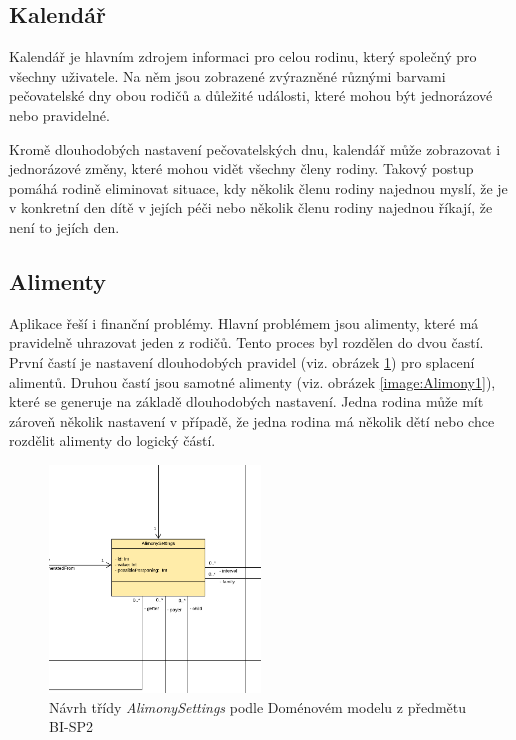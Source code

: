     \subsection{Kalendář}    
        Kalendář je hlavním zdrojem informaci pro celou rodinu, který společný pro všechny uživatele. Na něm jsou zobrazené zvýrazněné různými barvami pečovatelské dny obou rodičů a důležité události, které mohou být jednorázové nebo pravidelné. 
        
        Kromě dlouhodobých nastavení pečovatelských dnu, kalendář může zobrazovat i jednorázové změny, které mohou vidět všechny členy rodiny. Takový postup pomáhá rodině eliminovat situace, kdy několik členu rodiny najednou myslí, že je v konkretní den dítě v jejích péči nebo několik členu rodiny najednou říkají, že není to jejích den.  
    \subsection{Alimenty}    
        Aplikace řeší i finanční problémy. Hlavní problémem jsou alimenty, které má pravidelně uhrazovat jeden z rodičů. Tento proces byl rozdělen do dvou častí. První častí je nastavení dlouhodobých pravidel (viz. obrázek \ref{image:AlimonySettings1}) pro splacení alimentů. Druhou častí jsou samotné alimenty (viz. obrázek \ref{image:Alimony1}), které se generuje na základě dlouhodobých nastavení. Jedna rodina může mít zároveň několik nastavení v případě, že jedna rodina má několik dětí nebo chce rozdělit alimenty do logický částí.
        \begin{figure}\centering
	        \includegraphics[width=0.5\textwidth]{pdfs/AlimonySettings1}
	        \caption[Návrh AlimonySettings]{Návrh třídy \textit{AlimonySettings} podle Doménovém modelu z předmětu BI-SP2}\label{image:AlimonySettings1}
        \end{figure}
